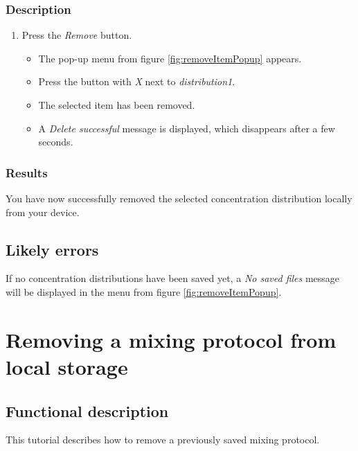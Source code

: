 \subsubsection{Description}
\begin{enumerate}
	\item Press the \emph{Remove} button.
		\begin{itemize}
			\item The pop-up menu from figure \ref{fig:removeItemPopup} appears.
	\item Press the button with \emph{X} next to \emph{distribution1}.
			\item The selected item has been removed.
			\item A \emph{Delete successful} message is displayed, which disappears after a few seconds.
		\end{itemize}
\end{enumerate}

\subsubsection{Results}
You have now successfully removed the selected concentration distribution locally from your device.

\subsection{Likely errors}
If no concentration distributions have been saved yet, a \emph{No saved files} message will be displayed in the menu from figure \ref{fig:removeItemPopup}.

\section{Removing a mixing protocol from local storage}\label{sec:remmixprot}

\subsection{Functional description}
This tutorial describes how to remove a previously saved mixing protocol.

